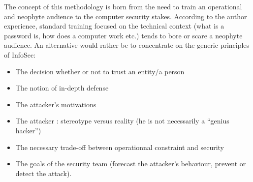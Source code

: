 \documentclass[11pt]{article} %
\begin{document}
The concept of this methodology is born from the need to train an 
operational and neophyte audience to the computer security 
stakes. According to the author experience, standard training
 focused on the technical context (what is a password is, how 
 does a computer work etc.) tends to bore or scare a neophyte audience. 
 An alternative would rather be to concentrate on the generic principles of InfoSec:
\begin{itemize}
\item The decision whether or not to trust an entity/a person 
\item The notion of in-depth defense  
\item The attacker's motivations
\item The attacker : stereotype versus reality (he is not necessarily a
 ``genius hacker'')
\item The necessary trade-off between operationnal constraint and security
\item The goals of the security team (forecast the attacker's behaviour, 
prevent or detect the attack). 
\end{itemize}
\end{document}
